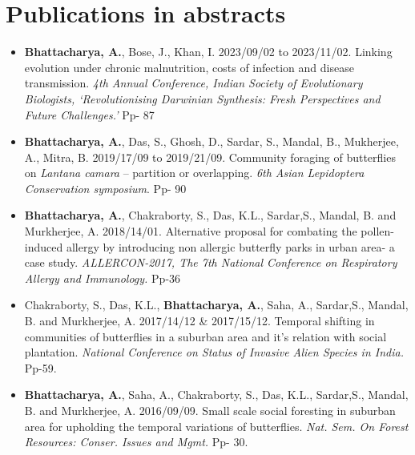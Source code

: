 \documentclass[a4paper,11pt]{article}
\begin{document}

\section{Publications in abstracts} 
\begin{itemize}
        \item {\textbf{Bhattacharya, A.}, Bose, J., Khan, I. 2023/09/02 to 2023/11/02. Linking evolution under chronic malnutrition, costs of infection and disease transmission. \textit{4th Annual Conference, Indian Society of Evolutionary Biologists, ‘Revolutionising Darwinian Synthesis: Fresh Perspectives and Future Challenges.’} Pp- 87}
    \end{itemize}
\begin{itemize}
        \item {\textbf{Bhattacharya, A.}, Das, S., Ghosh, D., Sardar, S., Mandal, B., Mukherjee, A., Mitra, B. 2019/17/09 to 2019/21/09. Community foraging of butterflies on \textit{Lantana camara} –
partition or overlapping. \textit{6th Asian Lepidoptera Conservation symposium}. Pp- 90}
    \end{itemize}
\begin{itemize}
        \item {\textbf{Bhattacharya, A.}, Chakraborty, S., Das, K.L., Sardar,S., Mandal, B. and Murkherjee, A.
2018/14/01. Alternative proposal for combating the pollen-induced allergy by introducing
non allergic butterfly parks in urban area- a case study. \textit{ALLERCON-2017, The 7th
National Conference on Respiratory Allergy and Immunology.} Pp-36}
    \end{itemize}
\begin{itemize}
        \item {Chakraborty, S., Das, K.L., \textbf{Bhattacharya, A.}, Saha, A., Sardar,S., Mandal, B. and Murkherjee, A. 2017/14/12 \& 2017/15/12. Temporal shifting in communities of butterflies in a suburban area and it’s relation with social plantation. \textit{National Conference on Status of Invasive Alien Species in India.} Pp-59.}
    \end{itemize}
\begin{itemize}
        \item {\textbf{Bhattacharya, A.}, Saha, A., Chakraborty, S., Das, K.L., Sardar,S., Mandal, B. and
Murkherjee, A. 2016/09/09. Small scale social foresting in suburban area for upholding
the temporal variations of butterflies. \textit{Nat. Sem. On Forest Resources: Conser. Issues
and Mgmt.} Pp- 30.}
    \end{itemize}
\end{document}
